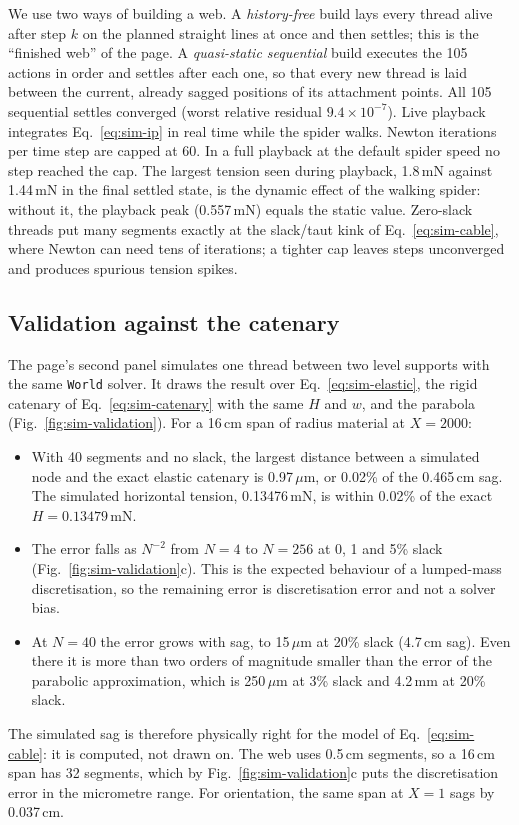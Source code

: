 We use two ways of building a web. A \emph{history-free} build lays every thread alive after step $k$ on the planned
straight lines at once and then settles; this is the ``finished web'' of the page. A \emph{quasi-static sequential}
build executes the 105 actions in order and settles after each one, so that every new thread is laid between the
current, already sagged positions of its attachment points. All 105 sequential settles converged (worst relative
residual $9.4\times10^{-7}$). Live playback integrates Eq.~\eqref{eq:sim-ip} in real time while the spider walks.
Newton iterations per time step are capped at 60. In a full playback at the default spider speed no step reached the
cap. The largest tension seen during playback, 1.8\,mN against 1.44\,mN in the final settled state, is the dynamic
effect of the walking spider: without it, the playback peak (0.557\,mN) equals the static value. Zero-slack threads put many segments exactly at the slack/taut kink of Eq.~\eqref{eq:sim-cable}, where Newton can need tens of
iterations; a tighter cap leaves steps unconverged and produces spurious tension spikes.

\subsection{Validation against the catenary}
\label{sec:sim-validation}

The page's second panel simulates one thread between two level supports with the same \texttt{World} solver. It
draws the result over Eq.~\eqref{eq:sim-elastic}, the rigid catenary of Eq.~\eqref{eq:sim-catenary} with the same $H$
and $w$, and the parabola (Fig.~\ref{fig:sim-validation}). For a 16\,cm span of radius material at $X=2000$:
\begin{itemize}
  \item With 40 segments and no slack, the largest distance between a simulated node and the exact elastic catenary is
        0.97\,$\mu$m, or 0.02\% of the 0.465\,cm sag. The simulated horizontal tension, 0.13476\,mN, is within
        0.02\% of the exact $H=0.13479$\,mN.
  \item The error falls as $N^{-2}$ from $N=4$ to $N=256$ at 0, 1 and 5\% slack
        (Fig.~\ref{fig:sim-validation}c). This is the expected behaviour of a lumped-mass discretisation, so the
        remaining error is discretisation error and not a solver bias.
  \item At $N=40$ the error grows with sag, to 15\,$\mu$m at 20\% slack (4.7\,cm sag). Even there it is more than two
        orders of magnitude smaller than the error of the parabolic approximation, which is 250\,$\mu$m at 3\% slack
        and 4.2\,mm at 20\% slack.
\end{itemize}
The simulated sag is therefore physically right for the model of Eq.~\eqref{eq:sim-cable}: it is computed, not drawn
on. The web uses 0.5\,cm segments, so a 16\,cm span has 32 segments, which by Fig.~\ref{fig:sim-validation}c puts the
discretisation error in the micrometre range. For orientation, the same span at $X=1$ sags by 0.037\,cm.

